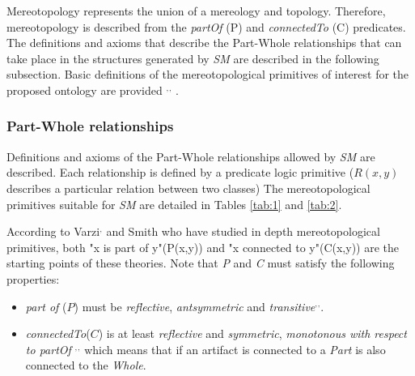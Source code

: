 \documentclass[runningheads,a4paper]{llncs}
\begin{document}
Mereotopology represents the union of a mereology and topology. Therefore, mereotopology is described from the \emph{partOf} (P) and \emph{connectedTo} (C) predicates.
The definitions and axioms that describe the Part-Whole relationships that can take place in the structures generated by \emph{SM} are
described in the following subsection. Basic definitions of the mereotopological primitives of interest for the proposed ontology are provided \cite{smith1996mereotopology} $^,$\cite{varzi1993bbm}$^,$ \cite{varzi1996parts}.

\subsubsection{Part-Whole relationships}\label{SH}
Definitions and axioms of the Part-Whole relationships allowed by \emph{SM} are described. Each relationship is defined by a predicate logic primitive ($R(x,y)$ describes a particular relation between two classes) The mereotopological primitives suitable for \emph{SM} are detailed in Tables \ref{tab:1} and \ref{tab:2}.%

According to Varzi\cite{varzi1993bbm}$^,$ \cite{varzi1996parts} and Smith\cite{smith1996mereotopology} who have studied in depth mereotopological primitives, both "x is part of y"(P(x,y)) and "x connected to y"(C(x,y)) are the starting points of these theories. Note that \textit{P} and \textit{C} must satisfy the following properties: 
\begin{itemize}

  \item \textit{part of} ($P$) must be \textit{reflective},  \textit{antsymmetric} and \textit{transitive}\cite{smith1996mereotopology}$^,$\cite{varzi1993bbm}$^,$\cite{varzi1996parts}.
  
\item \textit{connectedTo}($C$) is at least \textit{reflective} and \textit{symmetric}, \textit{monotonous with respect to \textit{partOf}} \cite{smith1996mereotopology}$^,$\cite{varzi1993bbm}$^,$\cite{varzi1996parts} which means that if an artifact is connected to a \textit{Part} is also connected to the \textit{Whole}.
\end{itemize}
\end{document}
